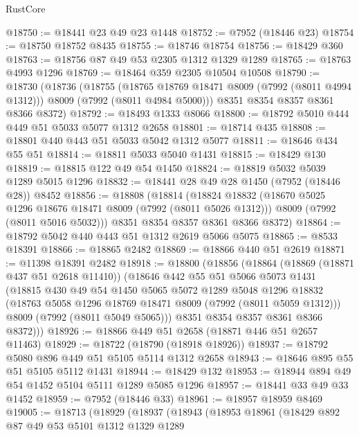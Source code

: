 \begin{lexlean}{RustCore}
\begin{coremodule}
@18750 := @18441 @23 @49 @23 @1448
@18752 := @7952 (@18446 @23)
@18754 := @18750 @18752 @8435
@18755 := @18746 @18754
@18756 := @18429 @360
@18763 := @18756 @87 @49 @53 @2305 @1312 @1329 @1289
@18765 := @18763 @4993 @1296
@18769 := @18464 @359 @2305 @10504 @10508
@18790 := @18730
    (@18736
      (@18755
        (@18765 @18769 @18471 @8009 (@7992 (@8011 @4994 @1312)))
        @8009
        (@7992 (@8011 @4984 @5000)))
      @8351
      @8354
      @8357
      @8361
      @8366
      @8372)
@18792 := @18493 @1333 @8066
@18800 := @18792 @5010 @444 @449 @51 @5033 @5077 @1312 @2658
@18801 := @18714 @435
@18808 := @18801 @440 @443 @51 @5033 @5042 @1312 @5077
@18811 := @18646 @434 @55 @51
@18814 := @18811 @5033 @5040 @1431
@18815 := @18429 @130
@18819 := @18815 @122 @49 @54 @1450
@18824 := @18819 @5032 @5039 @1289 @5015 @1296
@18832 := @18441 @28 @49 @28 @1450 (@7952 (@18446 @28)) @8452
@18856 := @18808
    (@18814
      (@18824
        @18832
        (@18670 @5025 @1296 @18676 @18471 @8009 (@7992 (@8011 @5026 @1312)))
        @8009
        (@7992 (@8011 @5016 @5032)))
      @8351
      @8354
      @8357
      @8361
      @8366
      @8372)
@18864 := @18792 @5042 @440 @443 @51 @1312 @2619 @5066 @5075
@18865 := @8533 @18391
@18866 := @18865 @2482
@18869 := @18866 @440 @51 @2619
@18871 := @11398 @18391 @2482
@18918 := @18800
    (@18856
      (@18864
        (@18869 (@18871 @437 @51 @2618 @11410))
        (@18646
          @442
          @55
          @51
          @5066
          @5073
          @1431
          (@18815
            @430
            @49
            @54
            @1450
            @5065
            @5072
            @1289
            @5048
            @1296
            @18832
            (@18763 @5058 @1296 @18769 @18471 @8009 (@7992 (@8011 @5059 @1312)))
            @8009
            (@7992 (@8011 @5049 @5065)))
          @8351
          @8354
          @8357
          @8361
          @8366
          @8372)))
@18926 := @18866 @449 @51 @2658 (@18871 @446 @51 @2657 @11463)
@18929 := @18722 (@18790 (@18918 @18926))
@18937 := @18792 @5080 @896 @449 @51 @5105 @5114 @1312 @2658
@18943 := @18646 @895 @55 @51 @5105 @5112 @1431
@18944 := @18429 @132
@18953 := @18944 @894 @49 @54 @1452 @5104 @5111 @1289 @5085 @1296
@18957 := @18441 @33 @49 @33 @1452
@18959 := @7952 (@18446 @33)
@18961 := @18957 @18959 @8469
@19005 := @18713
    (@18929
      (@18937
        (@18943
          (@18953
            @18961
            (@18429
              @892
              @87
              @49
              @53
              @5101
              @1312
              @1329
              @1289

\end{coremodule}
\end{lexlean}
